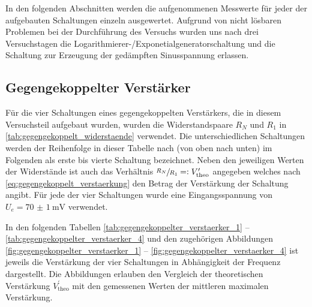 
In den folgenden Abschnitten werden die aufgenommenen Messwerte für jeder der
aufgebauten Schaltungen einzeln ausgewertet. Aufgrund von nicht lösbaren 
Problemen bei der Durchführung des Versuchs wurden uns nach drei Versuchstagen 
die Logarithmierer-/Exponetialgeneratorschaltung  und die Schaltung zur Erzeugung
der gedämpften Sinusspannung  erlassen.

\subsection{Gegengekoppelter Verstärker}

Für die vier Schaltungen eines gegengekoppelten Verstärkers, die 
in diesem Versuchsteil aufgebaut wurden, wurden die Widerstandspaare 
$R_{N}$ und  $R_{1}$ in \cref{tab:gegengekoppelt_widerstaende} verwendet.
Die unterschiedlichen Schaltungen werden der Reihenfolge in dieser Tabelle nach
(von oben nach unten) im Folgenden als erste bis vierte Schaltung bezeichnet.
Neben den jeweiligen Werten der Widerstände ist auch das Verhältnis 
$\sfrac{R_N}{R_1} =: V^{\prime}_{\mathrm{theo}}$
angegeben welches nach \cref{eq:gegengekoppelt_verstaerkung} den Betrag der Verstärkung
der Schaltung angibt. Für jede der vier Schaltungen wurde eine Eingangsspannung von 
$U_{e} = \SI{70(1)}{\milli\volt}$ verwendet.



In den folgenden Tabellen \ref{tab:gegengekoppelter_verstaerker_1} -- \ref{tab:gegengekoppelter_verstaerker_4}
und den zugehörigen Abbildungen \ref{fig:gegengekoppelter_verstaerker_1} -- \ref{fig:gegengekoppelter_verstaerker_4}
ist jeweils die Verstärkung der vier Schaltungen in Abhängigkeit der Frequenz dargestellt.
Die Abbildungen erlauben den Vergleich der theoretischen Verstärkung 
$V^{\prime}_{\mathrm{theo}}$ mit den gemessenen Werten der mittleren maximalen Verstärkung. 

%

